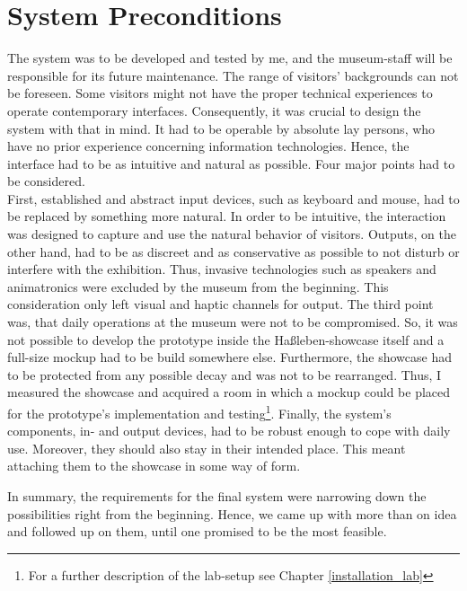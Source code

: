 
\section{System Preconditions}
\label{conception_system}

The system was to be developed and tested by me, and the museum-staff will be responsible for its future maintenance. The range of visitors' backgrounds can not be foreseen. Some visitors might not have the proper technical experiences to operate contemporary interfaces. Consequently, it was crucial to design the system with that in mind. It had to be operable by absolute lay persons, who have no prior experience concerning information technologies. Hence, the interface had to be as intuitive and natural as possible. Four major points had to be considered.
\\
First, established and abstract input devices, such as keyboard and mouse, had to be replaced by something more natural. In order to be intuitive, the interaction was designed to capture and use the natural behavior of visitors. Outputs, on the other hand, had to be as discreet and as conservative as possible to not disturb or interfere with the exhibition. Thus, invasive technologies such as speakers and animatronics were excluded by the museum from the beginning. This consideration only left visual and haptic channels for output. The third point was, that daily operations at the museum were not to be compromised. So, it was not possible to develop the prototype inside the Haßleben-showcase itself and a full-size mockup had to be build somewhere else. Furthermore, the showcase had to be protected from any possible decay and was not to be rearranged. Thus, I measured the showcase and acquired a room in which a mockup could be placed for the prototype's implementation and testing\footnote{For a further description of the lab-setup see Chapter \ref{installation_lab}}. Finally, the system's components, in- and output devices, had to be robust enough to cope with daily use. Moreover, they should also stay in their intended place. This meant attaching them to the showcase in some way of form.

In summary, the requirements for the final system were narrowing down the possibilities right from the beginning. Hence, we came up with more than on idea and followed up on them, until one promised to be the most feasible.

